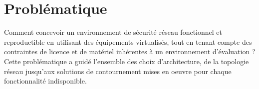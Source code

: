\section{Problématique}

Comment concevoir un environnement de sécurité réseau fonctionnel et reproductible en utilisant des équipements virtualisés, tout en tenant compte des contraintes de licence et de matériel inhérentes à un environnement d'évaluation ? Cette problématique a guidé l'ensemble des choix d'architecture, de la topologie réseau jusqu'aux solutions de contournement mises en oeuvre pour chaque fonctionnalité indisponible.
